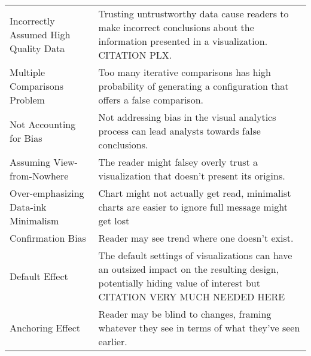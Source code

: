 \begin{table*}[]
\begin{tabular}{p{5cm}p{12cm}}
   \rowcolor{colord}\multirow{8}{0em}{\hspace{-0.6cm}\rotatebox{90}{\normalsize{Reading}}}Incorrectly Assumed High Quality Data & Trusting untrustworthy data cause readers to make incorrect conclusions about the information presented in a visualization. CITATION PLX.\\
 \rowcolor{colord-opaque}Multiple Comparisons Problem & Too many iterative comparisons has high probability of generating a configuration that offers a false comparison. \cite{pu2018garden, zgraggen2018investigating}\\
 \rowcolor{colord}Not Accounting for Bias & Not addressing bias in the visual analytics process can lead analysts towards false conclusions. \cite{wall2017warning}\\
 \rowcolor{colord-opaque}Assuming View-from-Nowhere & The reader might falsey overly trust a visualization that doesn't present its origins. \cite{dignazio2019draft}\\
 \rowcolor{colord}Over-emphasizing Data-ink Minimalism & Chart might not actually get read, minimalist charts are easier to ignore full message might get lost \cite{bateman2010useful}\\
 \rowcolor{colord-opaque}Confirmation Bias & Reader may see trend where one doesn't exist. \cite{valdez2017framework, few2019loom}\\
 \rowcolor{colord}Default Effect & The default settings of visualizations can have an outsized impact on the resulting design, potentially hiding value of interest but  \cite{hullman2011visualization} CITATION VERY MUCH NEEDED HERE\\
 \rowcolor{colord-opaque}Anchoring Effect & Reader may be blind to changes, framing whatever they see in terms of what they've seen earlier. \cite{ritchie2019lie, hullman2011visualization}\\
\end{tabular}
\label{table:mirage-table}
\end{table*}
